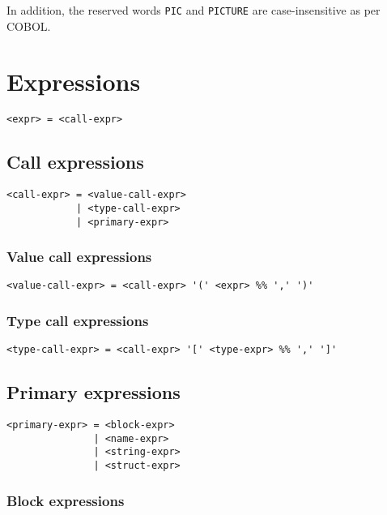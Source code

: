 \documentclass[12pt, oneside]{memoir}
\begin{document}
In addition, the reserved words \texttt{PIC} and \texttt{PICTURE} are
case-insensitive as per COBOL.

\chapter{Expressions}

\begin{verbatim}
<expr> = <call-expr>
\end{verbatim}

\section{Call expressions}

\begin{verbatim}
<call-expr> = <value-call-expr>
            | <type-call-expr>
            | <primary-expr>
\end{verbatim}

\subsection{Value call expressions}

\begin{verbatim}
<value-call-expr> = <call-expr> '(' <expr> %% ',' ')'
\end{verbatim}

\subsection{Type call expressions}

\begin{verbatim}
<type-call-expr> = <call-expr> '[' <type-expr> %% ',' ']'
\end{verbatim}

\section{Primary expressions}

\begin{verbatim}
<primary-expr> = <block-expr>
               | <name-expr>
               | <string-expr>
               | <struct-expr>
\end{verbatim}

\subsection{Block expressions}
\end{document}
